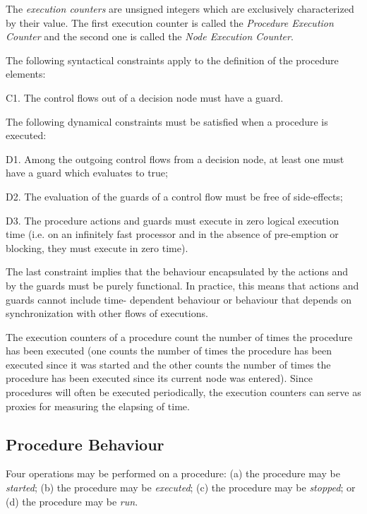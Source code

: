 The \emph{execution counters} are unsigned integers which are exclusively characterized by their value.
The first execution counter is called the \emph{Procedure Execution Counter} and the second one
is called the \emph{Node Execution Counter}.

The following syntactical constraints apply to the definition of the procedure elements:

\begin{fw_itemize}
\item C1. The control flows out of a decision node must have a guard.
\end{fw_itemize}

The following dynamical constraints must be satisfied when a procedure is executed:
\begin{fw_itemize}
\item D1. Among the outgoing control flows from a decision node, at least one must have a
guard which evaluates to true;
\item D2. The evaluation of the guards of a control flow must be free of side-effects;
\item D3. The procedure actions and guards must execute in zero logical execution time
(i.e. on an infinitely fast processor and in the absence of pre-emption or blocking, 
they must execute in zero time).
\end{fw_itemize}

The last constraint implies that the behaviour encapsulated by the actions and by the guards
must be purely functional. In practice, this means that actions and guards cannot include time-
dependent behaviour or behaviour that depends on synchronization with other flows of
executions.

The execution counters of a procedure count the number of times the procedure has
been executed (one counts the number of times the procedure has been executed since it 
was started and the other counts the number of times the procedure has been executed
since its current node was entered). Since procedures will often be executed periodically,
the execution counters can serve as proxies for measuring the elapsing of time.


\subsection{Procedure Behaviour}\label{sec:procBehaviour} 
Four operations may be performed on a procedure: (a) the procedure may be \emph{started}; (b) the
procedure may be \emph{executed}; (c) the procedure may be \emph{stopped}; or (d) the procedure may be
\emph{run}.

